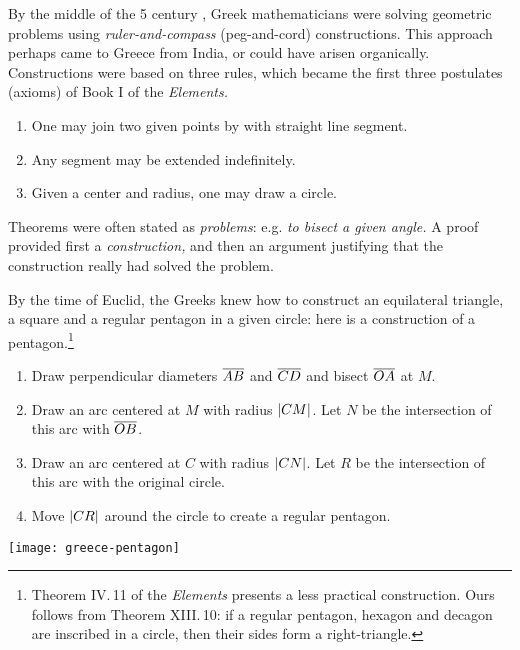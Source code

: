 By the middle of the 5\th{} century \!\BC, Greek mathematicians were solving geometric problems using \emph{ruler-and-compass} (peg-and-cord) constructions. This approach perhaps came to Greece from India, or could have arisen organically. Constructions were based on three rules, which became the first three postulates (axioms) of Book I of the \emph{Elements.}\vspace{-1pt}
\begin{enumerate}\itemsep0pt
  \item One may join two given points by with straight line segment.
  \item Any segment may be extended indefinitely.
  \item Given a center and radius, one may draw a circle.
\end{enumerate}\vspace{-1pt}
Theorems were often stated as \emph{problems}: e.g.{} \emph{to bisect a given angle.} A proof provided first a \emph{construction,} and then an argument justifying that the construction really had solved the problem.\smallbreak 

By the time of Euclid, the Greeks knew how to construct an equilateral triangle, a square and a regular pentagon in a given circle: here is a construction of a pentagon.\footnote{Theorem IV.\,11 of the \emph{Elements} presents a less practical construction. Ours follows from Theorem XIII.\,10: if a regular pentagon, hexagon and decagon are inscribed in a circle, then their sides form a right-triangle.}

\begin{minipage}[t]{0.69\linewidth}\vspace{-8pt}
	\begin{enumerate}\itemsep0pt
	  \item Draw perpendicular diameters $\overline{AB}$ and $\overline{CD}$ and bisect $\overline{OA}$ at $M$.
	  \item Draw an arc centered at $M$ with radius $\left| CM\right|$. Let $N$ be the intersection of this arc with $\overline{OB}$.
	  \item Draw an arc centered at $C$ with radius $\left| CN\right|$. Let $R$ be the intersection of this arc with the original circle.
		\item Move $\left| CR\right|$ around the circle to create a regular pentagon.
	\end{enumerate}
\end{minipage}
\hfill
\begin{minipage}[t]{0.3\linewidth}\vspace{-22pt}
	\flushright
	\texttt{[image: greece-pentagon]}
\end{minipage}
\smallbreak


